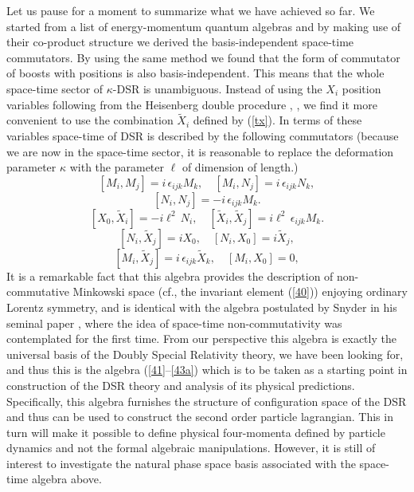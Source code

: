 \documentclass [prd,twocolumn,nofootinbib,showpacs]  {revtex4}
\begin{document}
Let us pause for a moment to summarize what we have achieved so
far. We started from a list of  energy-momentum quantum algebras
and by making use of their co-product structure we derived the
basis-independent space-time commutators.  By using the same
method we found that the form of commutator of boosts with
positions is also basis-independent. This means that the whole
space-time sector of $\kappa$-DSR is unambiguous. Instead of using
the $X_i$ position variables following from the Heisenberg double
procedure \cite{luno}, \cite{lukps}, we find it more convenient to
use the combination $\tilde{X}_i$ defined by (\ref{tx}). In terms
of these variables space-time of DSR is described by the following
commutators (because we are now in the space-time sector, it is
reasonable to replace the deformation parameter $\kappa$ with the
parameter $\ell$ of dimension of length.)
$$
[M_i, M_j] = i\, \epsilon_{ijk} M_k, \quad [M_i, N_j] = i\, \epsilon_{ijk} N_k,
$$
\begin{equation}\label{41}
  [N_i, N_j] = -i\, \epsilon_{ijk} M_k.
\end{equation}
\begin{equation}\label{42}
 [X_0, \tilde{X}_i] = - i\ell^2 \, N_i, \quad [\tilde{X}_i, \tilde{X}_j] =  i\ell^2 \,\epsilon_{ijk} M_k.
\end{equation}
\begin{equation}\label{43}
[N_i, \tilde{X}_j] = i X_0, \quad [N_i, X_0]= i \tilde{X}_j,
\end{equation}
\begin{equation}\label{43a}
[M_i, \tilde{X}_j] = i\, \epsilon_{ijk} \tilde{X}_k , \quad [M_i, X_0]= 0,
\end{equation}
It is a remarkable fact that this algebra provides the description
of non-commutative Minkowski space  (cf., the invariant element
(\ref{40})) enjoying ordinary Lorentz symmetry, and is identical
with the algebra postulated by Snyder in his seminal paper
\cite{snyder}, where the idea of space-time non-commutativity was
contemplated for the first time.  From our perspective this
algebra is exactly the universal basis of the Doubly Special
Relativity theory, we have been looking for, and thus this is the
algebra (\ref{41}--\ref{43a}) which is to be taken as a starting
point in construction of the DSR theory and analysis of its
physical predictions. Specifically, this algebra furnishes the
structure of configuration space of the DSR and thus can be used
to construct the second order particle lagrangian. This in turn
will make it possible to define physical four-momenta defined by
particle dynamics and not the formal algebraic manipulations.
However, it is still of interest to investigate the natural phase
space basis associated with the space-time algebra above.
\end{document}
